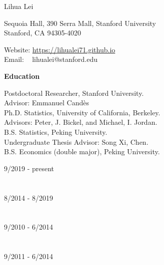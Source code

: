 \documentclass{article}
\begin{document}
\begin{Huge}
\noindent Lihua Lei
\end{Huge}

\vspace{5mm}
\begin{minipage}{0.6\linewidth}
  \flushleft
\noindent Sequoia Hall, 390 Serra Mall, Stanford University \\
\noindent Stanford, CA 94305-4020
\end{minipage}
\hfill
\begin{minipage}{0.4\linewidth}
  Website: \url{https://lihualei71.github.io}\\
  Email: \,\,\,\,\,lihualei@stanford.edu
\end{minipage}

\vspace{5mm}
\begin{large}
\noindent \textbf{Education}
\end{large}
\vspace{5mm}

\begin{minipage}{0.65\linewidth}
\noindent Postdoctoral Researcher, Stanford University.\\
Advisor: Emmanuel Cand\`{e}s\\

\noindent Ph.D. Statistics, University of California, Berkeley.\\
Advisors: Peter, J. Bickel, and Michael, I. Jordan.\\

\noindent B.S. Statistics, Peking University. \\
Undergraduate Thesis Advisor: Song Xi, Chen.\\

\noindent B.S. Economics (double major), Peking University.

\end{minipage}\hfill
\begin{minipage}{0.34\linewidth}
\flushright
\vspace{-1mm}
9/2019 - present\\
~\\
~\\
8/2014 - 8/2019 \\
~\\
~\\
9/2010 - 6/2014\\
~\\
~\\
9/2011 - 6/2014\\
\end{minipage}
\end{document}
